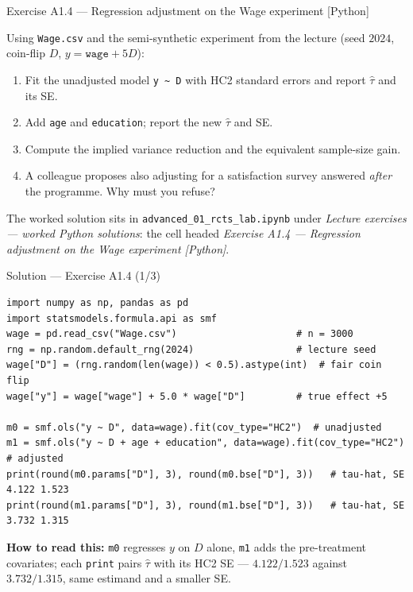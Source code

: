 \documentclass[aspectratio=169,11pt]{beamer}
\begin{document}
\begin{frame}{Exercise A1.4 --- Regression adjustment on the Wage experiment [Python]}
\begin{exercise}
  Using \texttt{Wage.csv} and the semi-synthetic experiment from the lecture
  (seed $2024$, coin-flip $D$, $y = \texttt{wage} + 5D$):
  \begin{enumerate}
    \item Fit the unadjusted model \texttt{y \~{} D} with HC2 standard errors and report
          $\hat\tau$ and its SE.
    \item Add \texttt{age} and \texttt{education}; report the new $\hat\tau$ and SE.
    \item Compute the implied variance reduction and the equivalent sample-size gain.
    \item A colleague proposes also adjusting for a satisfaction survey answered
          \emph{after} the programme. Why must you refuse?
  \end{enumerate}
\end{exercise}
\begin{labnote}
  The worked solution sits in \texttt{advanced\_01\_rcts\_lab.ipynb} under
  \emph{Lecture exercises --- worked Python solutions}: the cell headed
  \emph{Exercise A1.4 --- Regression adjustment on the Wage experiment [Python]}.
\end{labnote}
\end{frame}

\begin{frame}[fragile]{Solution --- Exercise A1.4 (1/3)}
\begin{solutionbox}
\begin{lstlisting}
import numpy as np, pandas as pd
import statsmodels.formula.api as smf
wage = pd.read_csv("Wage.csv")                     # n = 3000
rng = np.random.default_rng(2024)                  # lecture seed
wage["D"] = (rng.random(len(wage)) < 0.5).astype(int)  # fair coin flip
wage["y"] = wage["wage"] + 5.0 * wage["D"]         # true effect +5

m0 = smf.ols("y ~ D", data=wage).fit(cov_type="HC2")  # unadjusted
m1 = smf.ols("y ~ D + age + education", data=wage).fit(cov_type="HC2")  # adjusted
print(round(m0.params["D"], 3), round(m0.bse["D"], 3))   # tau-hat, SE 4.122 1.523
print(round(m1.params["D"], 3), round(m1.bse["D"], 3))   # tau-hat, SE 3.732 1.315
\end{lstlisting}
\vspace{1pt}
{\fontsize{7}{8.4}\selectfont
\textbf{How to read this:} \texttt{m0} regresses $y$ on $D$ alone, \texttt{m1} adds
the pre-treatment covariates; each \texttt{print} pairs $\hat\tau$ with its HC2 SE
--- $4.122/1.523$ against $3.732/1.315$, same estimand and a smaller SE.\par}
\end{solutionbox}
\end{frame}
\end{document}
